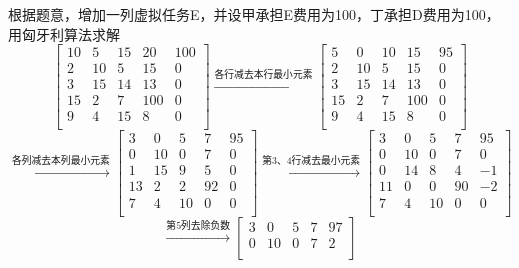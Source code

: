 \begin{solution}
    根据题意，增加一列虚拟任务E，并设甲承担E费用为100，丁承担D费用为100，用匈牙利算法求解
    $$\begin{bmatrix}
        10  & 5   & 15  & 20  & 100 \\
        2   & 10  & 5   & 15  & 0   \\
        3   & 15  & 14  & 13  & 0   \\
        15  & 2   & 7   & 100 & 0   \\
        9   & 4   & 15  & 8   & 0   \\
    \end{bmatrix}
    \xrightarrow{\text{各行减去本行最小元素}}
    \begin{bmatrix}
        5   & 0   & 10  & 15  & 95  \\
        2   & 10  & 5   & 15  & 0   \\
        3   & 15  & 14  & 13  & 0   \\
        15  & 2   & 7   & 100 & 0   \\
        9   & 4   & 15  & 8   & 0   \\
    \end{bmatrix}$$
    $$
    \xrightarrow{\text{各列减去本列最小元素}}
    \begin{bmatrix}
        3   & 0   & 5   & 7  & 95  \\
        0   & 10  & 0   & 7  & 0   \\
        1   & 15  & 9   & 5  & 0   \\
        13  & 2   & 2   & 92 & 0   \\
        7   & 4   & 10  & 0  & 0   \\
    \end{bmatrix}
    \xrightarrow{\text{第3、4行减去最小元素}}
    \begin{bmatrix}
        3   & 0   & 5   & 7  & 95  \\
        0   & 10  & 0   & 7  & 0   \\
        0   & 14  & 8   & 4  & -1  \\
        11  & 0   & 0   & 90 & -2  \\
        7   & 4   & 10  & 0  & 0   \\
    \end{bmatrix}$$
    $$
    \xrightarrow{\text{第5列去除负数}}
    \begin{bmatrix}
        3   & 0   & 5   & 7  & 97  \\
        0   & 10  & 0   & 7  & 2   \\

\end{bmatrix}$$
\end{solution}
